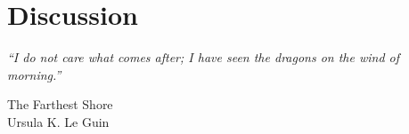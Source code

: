 \chapter{Discussion}\label{ch:discussion}
\epigraph{
    \emph{
        ``I do not care what comes after; I have seen the dragons on the wind of morning.''
} 
%
}
{The Farthest Shore\\Ursula K. Le Guin}
%
